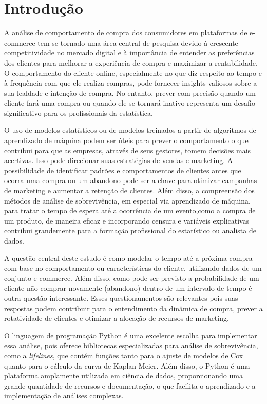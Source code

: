 
\section{Introdução}


A análise de comportamento de compra dos consumidores em plataformas de e-commerce tem se tornado uma área central de pesquisa devido à crescente competitividade no mercado digital e à importância de entender as preferências dos clientes para melhorar a experiência de compra e maximizar a rentabilidade. O comportamento do cliente online, especialmente no que diz respeito ao tempo e à frequência com que ele realiza compras, pode fornecer insights valiosos sobre a sua lealdade e intenção de compra. No entanto, prever com precisão quando um cliente fará uma compra ou quando ele se tornará inativo representa um desafio significativo para os profissionais da estatística. 

 O uso de modelos estatísticos ou de modelos treinados a partir de algoritmos de aprendizado de máquina podem ser úteis  para prever o comportamento o que contribui para que as empresas, através de seus gestores, tomem decisões mais acertivas. Isso pode  direcionar suas estratégias de vendas e marketing. A possibilidade de identificar padrões e comportamentos de clientes antes que ocorra uma compra ou um abandono pode ser a chave para otimizar campanhas de marketing e aumentar a retenção de clientes. Além disso, a compreensão dos métodos de análise de sobrevivência, em especial via aprendizado de máquina, para  tratar o tempo de espera até a ocorrência de um evento,como a compra de um produto, de maneira eficaz e incorporando censura e variáveis explicativas contribui grandemente para a formação profissional do estatístico ou analista de dados.

A questão central deste estudo é como modelar o tempo até a próxima compra com base no comportamento ou características do cliente, utilizando dados de um conjunto e-commerce. Além disso, como pode ser previsto  a probabilidade de um cliente não comprar novamente  (abandono) dentro de um intervalo de tempo é outra questão interessante. Esses questionamentos são relevantes pois suas respostas podem contribuir para o entendimento da dinâmica de compra, prever a rotatividade de clientes e otimizar a alocação de recursos de marketing.

 O linguagem de programação Python \cite{python} é uma excelente escolha para implementar essa análise, pois oferece bibliotecas especializadas para análise de sobrevivência, como a \textit{lifelines}, que contém funções tanto para o ajuste de modelos de Cox quanto para o cálculo da curva de Kaplan-Meier. Além disso, o Python é uma plataforma amplamente utilizada em ciência de dados, proporcionando uma grande quantidade de recursos e documentação, o que facilita o aprendizado e a implementação de análises complexas.

